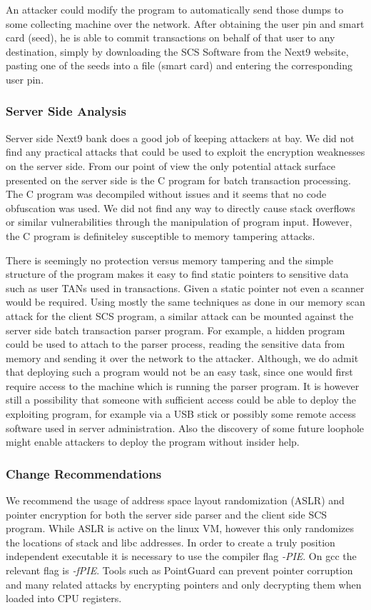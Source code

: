 \documentclass{llncs}
\begin{document}
An attacker could modify the program to automatically send those dumps to some collecting machine over the network. After obtaining the user pin and smart card (seed), he is able to commit transactions on behalf of that user to any destination, simply by downloading the SCS Software from the Next9 website, pasting one of the seeds into a file (smart card) and entering the corresponding user pin.

\subsubsection{Server Side Analysis}
Server side Next9 bank does a good job of keeping attackers at bay. We did not find any practical attacks that could be used to exploit the encryption weaknesses on the server side. From our point of view the only potential attack surface presented on the server side is the C program for batch transaction processing. The C program was decompiled without issues and it seems that no code obfuscation was used. We did not find any way to directly cause stack overflows or similar vulnerabilities through the manipulation of program input. However, the C program is definiteley susceptible to memory tampering attacks. 

There is seemingly no protection versus memory tampering and the simple structure of the program makes it easy to find static pointers to sensitive data such as user TANs used in transactions. Given a static pointer not even a scanner would be required. Using mostly the same techniques as done in our memory scan attack for the client SCS program, a similar attack can be mounted against the server side batch transaction parser program. For example, a hidden program could be used to attach to the parser process, reading the sensitive data from memory and sending it over the network to the attacker. Although, we do admit that deploying such a program would not be an easy task, since one would first require access to the machine which is running the parser program. It is however still a possibility that someone with sufficient access could be able to deploy the exploiting program, for example via a USB stick or possibly some remote access software used in server administration. Also the discovery of some future loophole might enable attackers to deploy the program without insider help.

\subsubsection{Change Recommendations}
We recommend the usage of address space layout randomization (ASLR) and pointer encryption for both the server side parser and the client side SCS program. While ASLR is active on the linux VM, however this only randomizes the locations of stack and libc addresses. In order to create a truly position independent executable it is necessary to use the compiler flag \emph{-PIE}. On gcc the relevant flag is \emph{-fPIE}. Tools such as PointGuard can prevent pointer corruption and many related attacks by encrypting pointers and only decrypting them when loaded into CPU registers.
\end{document}
